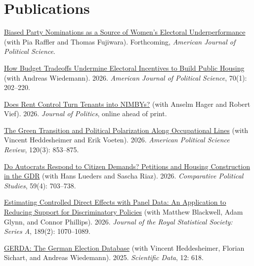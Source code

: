 \documentclass[letterpaper, 10pt]{article}
\newif\ifjobmarket
\newif\ifmerit
\begin{document}
\section*{Publications}
\begin{etaremune}
  \setlength\emergencystretch{1em}
  \setlength\itemsep{0.18em}
  \ifjobmarket\ifmerit\else\setlength\itemsep{0.4em}\fi\fi
  \ifmerit\else
  \item \href{https://osf.io/preprints/osf/hgc2z}{Biased Party Nominations as a Source of Women's Electoral Underperformance} (with Pia Raffler and Thomas Fujiwara). Forthcoming, \textit{American Journal of Political Science}.\ifjobmarket \\
  \textit{Media coverage:} \href{https://www.capradio.org/news/npr/story?storyid=g-s1-96043}{NPR}.\fi
  \fi
  \item \href{https://onlinelibrary.wiley.com/doi/10.1111/ajps.12939?af=R}{How Budget Tradeoffs Undermine Electoral Incentives to Build Public Housing} (with Andreas Wiedemann). 2026. \textit{American Journal of Political Science}, 70(1): 202--220.
  \item \href{https://doi.org/10.1086/738581}{Does Rent Control Turn Tenants into NIMBYs?} (with Anselm Hager and Robert Vief). 2026. \textit{Journal of Politics}, online ahead of print.\ifjobmarket \\
  \textit{Media coverage:} \href{https://www.theatlantic.com/economy/archive/2025/11/mamdani-housing-rent-control/684790/}{The Atlantic}.\fi
  \item \href{https://doi.org/10.1017/S0003055425101226}{The Green Transition and Political Polarization Along Occupational Lines} (with Vincent Heddesheimer and Erik Voeten). 2026. \textit{American Political Science Review}, 120(3): 853--875.
  \item \href{https://doi.org/10.1177/00104140251342919}{Do Autocrats Respond to Citizen Demands? Petitions and Housing Construction in the GDR} (with Hans Lueders and Sascha Riaz). 2026. \textit{Comparative Political Studies}, 59(4): 703--738.
  \item \href{https://doi.org/10.1093/jrsssa/qnaf042}{Estimating Controlled Direct Effects with Panel Data: An Application to Reducing Support for Discriminatory Policies} (with Matthew Blackwell, Adam Glynn, and Connor Phillips). 2026. \textit{Journal of the Royal Statistical Society: Series A}, 189(2): 1070--1089.
  \item \href{https://www.nature.com/articles/s41597-025-04811-5}{GERDA: The German Election Database} (with Vincent Heddesheimer, Florian Sichart, and Andreas Wiedemann). 2025. \textit{Scientific Data}, 12: 618.

\end{etaremune}
\end{document}
